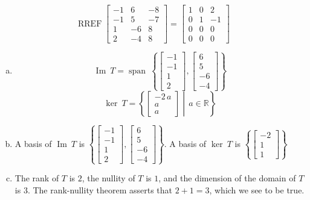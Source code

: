 \begin{exerciseAnswer} 


\[\operatorname{RREF} \left[\begin{array}{ccc}
-1 & 6 & -8 \\
-1 & 5 & -7 \\
1 & -6 & 8 \\
2 & -4 & 8
\end{array}\right] = \left[\begin{array}{ccc}
1 & 0 & 2 \\
0 & 1 & -1 \\
0 & 0 & 0 \\
0 & 0 & 0
\end{array}\right] \]


\begin{enumerate}[(a)]
\item \[\operatorname{Im}\ T = \operatorname{span}\  \left\{ \left[\begin{array}{c}
-1 \\
-1 \\
1 \\
2
\end{array}\right] , \left[\begin{array}{c}
6 \\
5 \\
-6 \\
-4
\end{array}\right] \right\} \]\[\operatorname{ker}\ T =  \left\{ \left[\begin{array}{c}
-2 \, a \\
a \\
a
\end{array}\right] \middle|\,a\in\mathbb{R}\right\} \]
\item  A basis of \(\operatorname{Im}\ T\) is \( \left\{ \left[\begin{array}{c}
-1 \\
-1 \\
1 \\
2
\end{array}\right] , \left[\begin{array}{c}
6 \\
5 \\
-6 \\
-4
\end{array}\right] \right\} \). A basis of \(\operatorname{ker}\ T\) is \( \left\{ \left[\begin{array}{c}
-2 \\
1 \\
1
\end{array}\right] \right\} \)
\item  The rank of \(T\) is \( 2 \), the nullity of \(T\) is \( 1 \), and the dimension of the domain of \(T\) is \( 3 \). The rank-nullity theorem asserts that \( 2 + 1 = 3 \), which we see to be true. 
\end{enumerate}
    
\end{exerciseAnswer}
    
